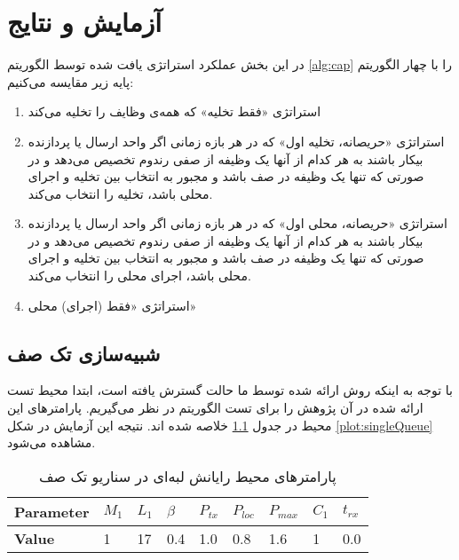 \chapter{آزمایش و نتایج}
در این بخش عملکرد استراتژی یافت شده توسط الگوریتم \ref{alg:cap} را با چهار الگوریتم پایه زیر مقایسه می‌کنیم:
\begin{enumerate}
	\item استراتژی «فقط تخلیه» که همه‌ی وظایف را تخلیه می‌کند
	\item استراتژی «حریصانه، تخلیه اول» که در هر بازه زمانی اگر واحد ارسال یا پردازنده بیکار باشند به هر کدام از آنها یک وظیفه از صفی رندوم تخصیص می‌دهد و در صورتی که تنها یک وظیفه در صف باشد و مجبور به انتخاب بین تخلیه و اجرای محلی باشد، تخلیه را انتخاب می‌کند.
	\item استراتژی «حریصانه، محلی اول» که در هر بازه زمانی اگر واحد ارسال یا پردازنده بیکار باشند به هر کدام از آنها یک وظیفه از صفی رندوم تخصیص می‌دهد و در صورتی که تنها یک وظیفه در صف باشد و مجبور به انتخاب بین تخلیه و اجرای محلی باشد، اجرای محلی را انتخاب می‌کند.
	\item استراتژی «فقط (اجرای) محلی»
\end{enumerate}
\newpage
\section{شبیه‌سازی تک صف}
با توجه به اینکه روش ارائه شده توسط ما حالت گسترش یافته \cite{Liu} است، ابتدا محیط تست ارائه شده در آن پژوهش را برای تست الگوریتم در نظر می‌گیریم. پارامترهای این محیط در جدول \ref{table:parameters-singlequeue} خلاصه شده اند. نتیجه این آزمایش در شکل \ref{plot:singleQueue} مشاهده می‌شود.

\begin{table}[H]
	\centering
	\begin{latin}
		\begin{tabular}{@{}lllllllll@{}}
			\toprule
			\textbf{Parameter} & $M_1$ & $L_1$ & $\beta$ & $P_{tx}$ & $P_{loc}$ & $P_{max}$ & $C_1$ & $t_{rx}$ \\ \midrule
			\textbf{Value}             & 1    & 17   & 0.4  & 1.0 & 0.8  & 1.6  & 1    & 0.0   \\ \bottomrule
		\end{tabular}
	\end{latin}
	\caption{پارامترهای محیط رایانش لبه‌ای در سناریو تک صف}
	\label{table:parameters-singlequeue}
\end{table}

